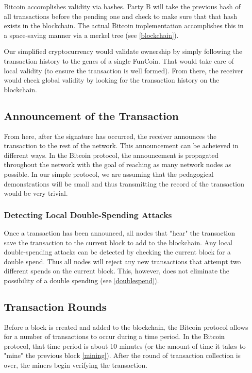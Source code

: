 \documentclass[12pt]{article}
\begin{document}
Bitcoin accomplishes validity via hashes. Party B will take the previous hash of all transactions before the pending one
and check to make sure that that hash exists in the blockchain. The actual Bitcoin implementation accomplishes
this in a space-saving manner via a merkel tree (see \ref{blockchain}).

Our simplified cryptocurrency would validate ownership by simply following the transaction history to the
genes of a single FunCoin. That would take care of local validity (to ensure the transaction is well formed).
From there, the receiver would check global validity by looking for the transaction history on the blockchain.

\subsection{Announcement of the Transaction}
From here, after the signature has occurred, the receiver announces the transaction to the rest of the network.
This announcement can be acheieved in different ways. In the Bitcoin protocol, the announcement is propagated throughout
the network with the goal of reaching as many network nodes as possible. In our simple protocol, we are assuming
that the pedagogical demonstrations will be small and thus transmitting the record of the transaction would be very trivial.

\subsubsection{Detecting Local Double-Spending Attacks}
Once a transaction has been announced, all nodes that "hear" the transaction save the transaction to the current block to
add to the blockchain. Any local double-spending attacks can be detected by checking the current block for a double spend.
Thus all nodes will reject any new transactions that attempt two different spends on the current block. This, however, does
not eliminate the possibility of a double spending (see \ref{doublespend}).

\subsection{Transaction Rounds}
Before a block is created and added to the blockchain, the Bitcoin protocol allows for a number of transactions to occur
during a time period. In the Bitcoin protocol, that time period is about 10 minutes (or the amount of time it takes to "mine" the previous block \ref{mining}). After the round of
transaction collection is over, the miners begin verifying the transaction.
\end{document}
